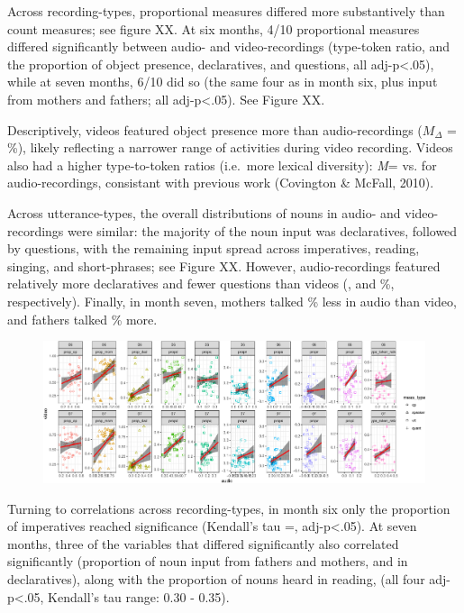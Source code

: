 \documentclass[man]{apa6}
\theoremstyle{definition}
\theoremstyle{definition}
\theoremstyle{definition}
\theoremstyle{remark}
\begin{document}
Across recording-types, proportional measures differed more
substantively than count measures; see figure XX. At six months, 4/10
proportional measures differed significantly between audio- and
video-recordings (type-token ratio, and the proportion of object
presence, declaratives, and questions, all adj-p\textless{}.05), while
at seven months, 6/10 did so (the same four as in month six, plus input
from mothers and fathers; all adj-p\textless{}.05). See Figure XX.

Descriptively, videos featured object presence more than
audio-recordings (\(M_{\Delta}\) = \%), likely reflecting a narrower
range of activities during video recording. Videos also had a higher
type-to-token ratios (i.e.~more lexical diversity): \emph{M}= vs. for
audio-recordings, consistant with previous work (Covington \& McFall,
2010).

Across utterance-types, the overall distributions of nouns in audio- and
video-recordings were similar: the majority of the noun input was
declaratives, followed by questions, with the remaining input spread
across imperatives, reading, singing, and short-phrases; see Figure XX.
However, audio-recordings featured relatively more declaratives and
fewer questions than videos (, and \%, respectively). Finally, in month
seven, mothers talked \% less in audio than video, and fathers talked \%
more.

\begin{figure}[htbp]
\centering
\includegraphics{sixseven_papaja_files/figure-latex/gr_derived_props_av-1.pdf}
\caption{}
\end{figure}

Turning to correlations across recording-types, in month six only the
proportion of imperatives reached significance (Kendall's tau =,
adj-p\textless{}.05). At seven months, three of the variables that
differed significantly also correlated significantly (proportion of noun
input from fathers and mothers, and in declaratives), along with the
proportion of nouns heard in reading, (all four adj-p\textless{}.05,
Kendall's tau range: 0.30 - 0.35).
\end{document}
